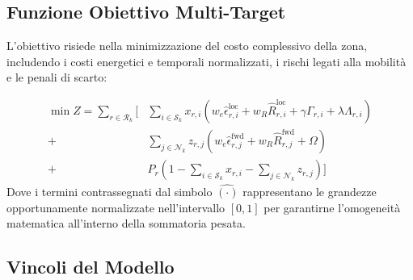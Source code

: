\documentclass[12pt]{article}
\begin{document}
\subsection{Funzione Obiettivo Multi-Target}
L'obiettivo risiede nella minimizzazione del costo complessivo della zona, includendo i costi energetici e temporali normalizzati, i rischi legati alla mobilit\`a e le penali di scarto:

\begin{equation}
\begin{aligned}
\min Z = \sum_{r \in \mathcal{R}_k} \Bigg[ & \sum_{i \in \mathcal{S}_k} x_{r,i} \left( w_e \widehat{\epsilon}_{r,i}^{\text{loc}} + w_R \widehat{R}_{r,i}^{\text{loc}} + \gamma \Gamma_{r,i} + \lambda \Lambda_{r,i} \right) \\
+ & \sum_{j \in \mathcal{N}_k} z_{r,j} \left( w_e \widehat{\epsilon}_{r,j}^{\text{fwd}} + w_R \widehat{R}_{r,j}^{\text{fwd}} + \Omega \right) \\
+ & P_r \left( 1 - \sum_{i \in \mathcal{S}_k} x_{r,i} - \sum_{j \in \mathcal{N}_k} z_{r,j} \right) \Bigg]
\end{aligned}
\end{equation}
Dove i termini contrassegnati dal simbolo $\widehat{(\cdot)}$ rappresentano le grandezze opportunamente normalizzate nell'intervallo $[0,1]$ per garantirne l'omogeneit\`a matematica all'interno della sommatoria pesata.

\subsection{Vincoli del Modello}
\end{document}
